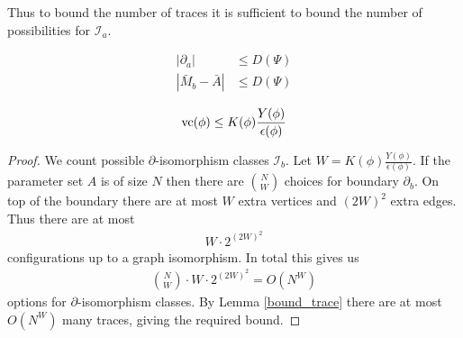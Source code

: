\documentclass{amsart}
\newcommand{\II}{\mathscr I}
\begin{document}
Thus to bound the number of traces it is sufficient to bound the number of possibilities for $\II_a$.

\begin{Theorem} \label{main_bound}
	\begin{align*}
		|\partial_a| &\leq D(\Psi) \\ 
		|\bar M_b - \bar A| &\leq D(\Psi)
	\end{align*}
\end{Theorem}

\begin{Corollary}
	\begin{align*}
		\operatorname{vc}(\phi) \leq K(\phi) \frac{Y(\phi)}{\epsilon(\phi)}
	\end{align*}
\end{Corollary}

\begin{proof}
		We count possible $\partial$-isomorphism classes $\II_b$.
		Let $W = K(\phi) \frac{Y(\phi)}{\epsilon(\phi)}$.
		If the parameter set $A$ is of size $N$ then there are $N \choose W$ choices for boundary $\partial_b$.
		On top of the boundary there are at most $W$ extra vertices and $(2W)^2$ extra edges.
		Thus there are at most
		\begin{align*}
			W \cdot 2^{(2W)^2}
		\end{align*}
		configurations up to a graph isomorphism.
		In total this gives us 
		\begin{align*}
			{N \choose W} \cdot W \cdot 2^{(2W)^2} = O(N^W)
		\end{align*}
		options for $\partial$-isomorphism classes.
		By Lemma \ref{bound_trace} there are at most $O(N^W)$ many traces, giving the required bound.
\end{proof}
\end{document}
